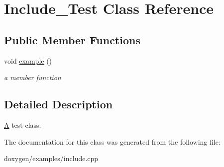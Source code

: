 \hypertarget{class_include___test}{}\section{Include\+\_\+\+Test Class Reference}
\label{class_include___test}
\subsection*{Public Member Functions}
\begin{DoxyCompactItemize}
\item 
\mbox{\label{class_include___test_aa286655e8f7f6a8ad203ef5fd8548b81}} 
void \mbox{\hyperlink{class_include___test_aa286655e8f7f6a8ad203ef5fd8548b81}{example}} ()
\begin{DoxyCompactList}\small\item\em a member function \end{DoxyCompactList}\end{DoxyCompactItemize}


\subsection{Detailed Description}
\mbox{\hyperlink{class_a}{A}} test class. 

The documentation for this class was generated from the following file\+:\begin{DoxyCompactItemize}
\item 
doxygen/examples/include.\+cpp\end{DoxyCompactItemize}
